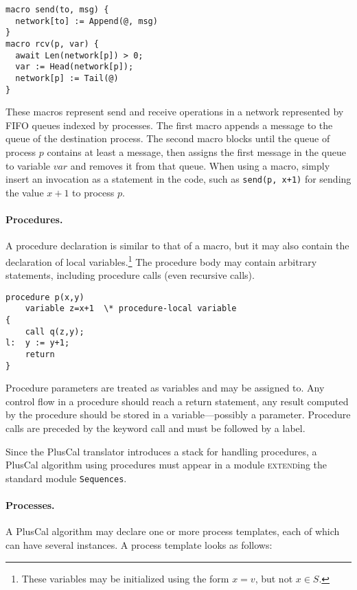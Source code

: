 \documentclass[11pt,fleqn]{article}
\newcommand{\kw}[1]{\textnormal{\textsc{#1}}}
\newcommand{\EXTEND}{\kw{extend}}
\begin{document}
\begin{verbatim}
macro send(to, msg) {
  network[to] := Append(@, msg)
}
macro rcv(p, var) {
  await Len(network[p]) > 0;
  var := Head(network[p]);
  network[p] := Tail(@)
}
\end{verbatim}

These macros represent send and receive operations in a network represented by
FIFO queues indexed by processes. The first macro appends a message to the queue
of the destination process. The second macro blocks until the queue of process
$p$ contains at least a message, then assigns the first message in the queue to
variable $\mathit{var}$ and removes it from that queue. When using a macro,
simply insert an invocation as a statement in the code, such as
\verb|send(p, x+1)| for sending the value $x+1$ to process $p$.

\paragraph{Procedures.}

A procedure declaration is similar to that of a macro, but it may also contain
the declaration of local variables.\footnote{These variables may be initialized
  using the form $x = v$, but not $x \in S$.} The procedure body may contain
arbitrary statements, including procedure calls (even recursive calls).

\begin{verbatim}
procedure p(x,y)
    variable z=x+1  \* procedure-local variable
{
    call q(z,y);
l:  y := y+1;
    return
}
\end{verbatim}

Procedure parameters are treated as variables and may be assigned to. Any
control flow in a procedure should reach a return statement, any result computed
by the procedure should be stored in a variable---possibly a parameter.
Procedure calls are preceded by the keyword call and must be followed by a
label.

Since the PlusCal translator introduces a stack for handling procedures, a
PlusCal algorithm using procedures must appear in a module \EXTEND{}ing the
standard module \verb|Sequences|.

\paragraph{Processes.}

A PlusCal algorithm may declare one or more process templates, each of which can
have several instances. A process template looks as follows:
\end{document}
